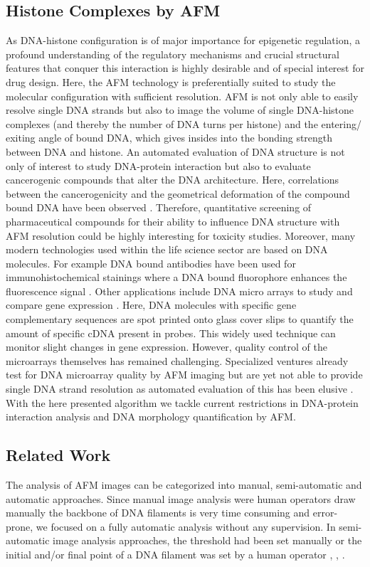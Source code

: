 \documentclass{article}
\begin{document}
\subsection{Histone Complexes by AFM}\label{sec: Histone Complexes by AFM}
As DNA-histone configuration is of major importance for epigenetic regulation, a profound understanding of the regulatory mechanisms and crucial structural features that conquer this interaction is highly desirable and of special interest for drug design. Here, the AFM technology is preferentially suited to study the molecular configuration with sufficient resolution. AFM is not only able to easily resolve single DNA strands but also to image the volume of single DNA-histone complexes (and thereby the number of DNA turns per histone) and the entering/ exiting angle of bound DNA, which gives insides into the bonding strength between DNA and histone. 
An automated evaluation of DNA structure is not only of interest to study DNA-protein interaction but also to evaluate cancerogenic compounds that alter the DNA architecture. Here, correlations between the cancerogenicity and the geometrical deformation of the compound bound DNA have been observed \cite{japaridze2015influence}. Therefore, quantitative screening of pharmaceutical compounds for their ability to influence DNA structure with AFM resolution could be highly interesting for toxicity studies. 
Moreover, many modern technologies used within the life science sector are based on DNA molecules. For example DNA bound antibodies have been used for immunohistochemical stainings where a DNA bound fluorophore enhances the fluorescence signal \cite{chen2015expansion}. Other applications include DNA micro arrays to study and compare gene expression \cite{adomas2008comparative}. Here, DNA molecules with specific gene complementary sequences are spot printed onto glass cover slips to quantify the amount of specific cDNA present in probes. This widely used technique can monitor slight changes in gene expression. However, quality control of the microarrays themselves has remained challenging. Specialized ventures already test for DNA microarray quality by AFM imaging but are yet not able to provide single DNA strand resolution as automated evaluation of this has been elusive \cite{dokukin2011towards}. With the here presented algorithm we tackle current restrictions in DNA-protein interaction analysis and DNA morphology quantification by AFM. 
\subsection{Related Work}\label{sec: Related Work}
The analysis of AFM images can be categorized into manual, semi-automatic and automatic approaches. Since manual image analysis were human operators draw manually the backbone of DNA filaments is very time consuming and error-prone, we focused on a fully automatic analysis without any supervision. In semi-automatic image analysis approaches, the threshold had been set manually or the initial and/or final point of a DNA filament was set by a human operator  \cite{wiggins2006high},  \cite{marek2005interactive},  \cite{cassina2016effects}.
\end{document}
